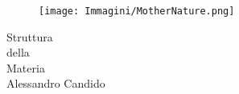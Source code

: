 
\thispagestyle{empty}

\begin{multicols}{2}
\vspace*{120pt}
\begin{figure}[H]
	\centering
	\texttt{[image: Immagini/MotherNature.png]}
\end{figure}

\vfill\null
\columnbreak

\begin{flushright}
	\vspace*{100pt}
	{\fontsize{2cm}{1.5cm}\selectfont
		 Struttura \\della \\Materia}\\
	\vspace{20pt}
	{\fontsize{0.8cm}{0cm}\selectfont Alessandro Candido}\\
\end{flushright}
\vspace{30pt}
\end{multicols}